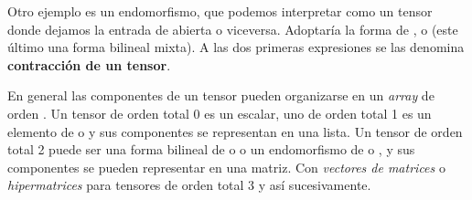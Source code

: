 Otro ejemplo es un endomorfismo, que podemos interpretar como un tensor  donde dejamos la entrada de  abierta o viceversa. Adoptaría la forma de ,  o  (este último una forma bilineal mixta).
A las dos primeras expresiones se las denomina \textbf{contracción de un tensor}.

En general las componentes de un tensor  pueden organizarse en un \textit{array} de orden . Un tensor de orden total 0 es un escalar, uno de orden total 1 es un elemento de  o  y sus componentes se representan en una lista. Un tensor de orden total 2 puede ser una forma bilineal de  o  o un endomorfismo de  o , y sus componentes se pueden representar en una matriz. Con \textit{vectores de matrices} o \textit{hipermatrices} para tensores de orden total 3 y así sucesivamente.